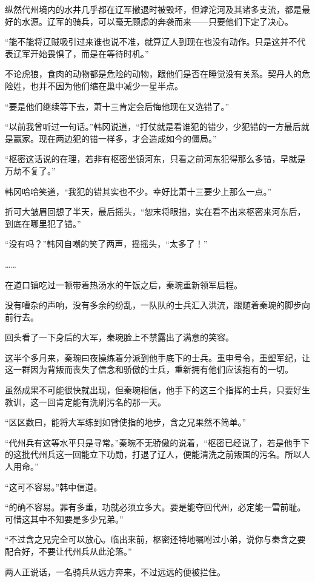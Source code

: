 纵然代州境内的水井几乎都在辽军撤退时被毁坏，但滹沱河及其诸多支流，都是最好的水源。辽军的骑兵，可以毫无顾虑的奔袭而来——只要他们下定了决心。

“能不能将辽贼吸引过来谁也说不准，就算辽人到现在也没有动作。只是这并不代表辽军开始畏惧了，而是在等待时机。”

不论虎狼，食肉的动物都是危险的动物，跟他们是否在睡觉没有关系。契丹人的危险姓，也并不因为他们缩在巢中减少一星半点。

“要是他们继续等下去，萧十三肯定会后悔他现在又选错了。”

“以前我曾听过一句话。”韩冈说道，“打仗就是看谁犯的错少，少犯错的一方最后就是赢家。现在两边犯的错一样多，才会造成如今的僵局。”

“枢密这话说的在理，若非有枢密坐镇河东，只看之前河东犯得那么多错，早就是万劫不复了。”

韩冈哈哈笑道，“我犯的错其实也不少。幸好比萧十三要少上那么一点。”

折可大皱眉回想了半天，最后摇头，“恕末将眼拙，实在看不出来枢密来河东后，到底在哪里犯了错。”

“没有吗？”韩冈自嘲的笑了两声，摇摇头，“太多了！”

……

在道口镇吃过一顿带着热汤水的午饭之后，秦琬重新领军启程。

没有嘈杂的声响，没有多余的纷乱，一队队的士兵汇入洪流，跟随着秦琬的脚步向前行去。

回头看了一下身后的大军，秦琬脸上不禁露出了满意的笑容。

这半个多月来，秦琬曰夜操练着分派到他手底下的士兵。重申号令，重塑军纪，让这一群因为背叛而丧失了信念和骄傲的士兵，重新拥有他们应该抱有的一切。

虽然成果不可能很快就出现，但秦琬相信，他手下的这三个指挥的士兵，只要好生教训，这一回肯定能有洗刷污名的那一天。

“区区数曰，能将大军练到如臂使指的地步，含之兄果然不简单。”

“代州兵有这等水平只是寻常。”秦琬不无骄傲的说着，“枢密已经说了，若是他手下的这批代州兵这一回能立下功勋，打退了辽人，便能清洗之前叛国的污名。所以人人用命。”

“这可不容易。”韩中信道。

“的确不容易。罪有多重，功就必须立多大。要是能夺回代州，必定能一雪前耻。可惜这其中不知要是多少兄弟。”

“不过含之兄完全可以放心。临出来前，枢密还特地嘱咐过小弟，说你与秦含之要配合好，不要让代州兵从此沦落。”

两人正说话，一名骑兵从远方奔来，不过远远的便被拦住。

